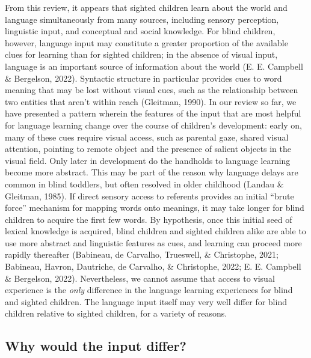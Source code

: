 \documentclass[
  man,floatsintext]{apa6}
\begin{document}
From this review, it appears that sighted children learn about the world and language simultaneously from many sources, including sensory perception, linguistic input, and conceptual and social knowledge. For blind children, however, language input may constitute a greater proportion of the available clues for learning than for sighted children; in the absence of visual input, language is an important source of information about the world (E. E. Campbell \& Bergelson, 2022). Syntactic structure in particular provides cues to word meaning that may be lost without visual cues, such as the relationship between two entities that aren't within reach (Gleitman, 1990). In our review so far, we have presented a pattern wherein the features of the input that are most helpful for language learning change over the course of children's development: early on, many of these cues require visual access, such as parental gaze, shared visual attention, pointing to remote object and the presence of salient objects in the visual field. Only later in development do the handholds to language learning become more abstract. This may be part of the reason why language delays are common in blind toddlers, but often resolved in older childhood (Landau \& Gleitman, 1985). If direct sensory access to referents provides an initial ``brute force'' mechanism for mapping words onto meanings, it may take longer for blind children to acquire the first few words. By hypothesis, once this initial seed of lexical knowledge is acquired, blind children and sighted children alike are able to use more abstract and linguistic features as cues, and learning can proceed more rapidly thereafter (Babineau, de Carvalho, Trueswell, \& Christophe, 2021; Babineau, Havron, Dautriche, de Carvalho, \& Christophe, 2022; E. E. Campbell \& Bergelson, 2022). Nevertheless, we cannot assume that access to visual experience is the \emph{only} difference in the language learning experiences for blind and sighted children. The language input itself may very well differ for blind children relative to sighted children, for a variety of reasons.

\hypertarget{why-would-the-input-differ}{%
\subsection{Why would the input differ?}\label{why-would-the-input-differ}}
\end{document}
